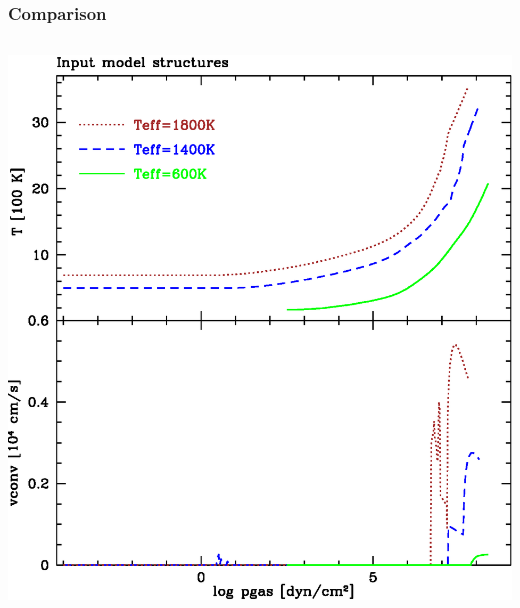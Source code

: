 \message{ !name(May13.tex)}\documentclass[14pt]{beamer}
\begin{document}
\begin{frame}
  \frametitle{Comparison}
  \begin{columnsonlytextwidth}
    \begin{column}{0.35\textwidth}
      \centering
      \includegraphics[width=\columnwidth]{InputStructure}
    \end{column}
    \begin{column}{0.6\textwidth}
      \centering

\end{column}
\end{columnsonlytextwidth}
\end{frame}
\end{document}
